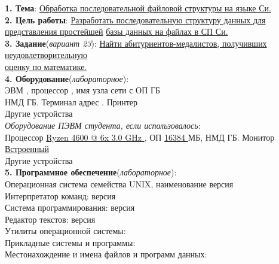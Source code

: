\documentclass[10pt]{report}
\begin{document}
    \begin{spacing}{1}
        \indent \textbf{1. Тема}: \underline{Обработка последовательной файловой структуры на языке Си.}\\               %
        \indent \textbf{2. Цель работы}: \underline{Разработать последовательную структуру данных для представления простейшей} 
        \indent \underline{базы данных на файлах в СП Си.} \\       %
        \indent \textbf{3. Задание}(\textit{вариант 23}): \underline{Найти абитуриентов-медалистов, получивших неудовлетворительную}\\
        \indent \underline{оценку по математике.}  \\           %
        \indent \textbf{4. Оборудование}(\textit{лабораторное}):  \\ 
        \indent ЭВМ \tlinee{0.5in}, процессор \tlinee{0.7in}, имя узла сети \tlinee{0.3in} с ОП \tlinee{0.2in} ГБ\\
        \indent НМД \tlinee{0.5in} ГБ. Терминал \tlinee{0.7in} адрес \tlinee{0.7in}. Принтер \tlinee{0.7in}\\
        \indent Другие устройства \tlinee{2.5in} \\
        \indent \textit{Оборудование ПЭВМ студента, если использовалось}:  \\ 
        \indent Процессор \underline{ Ryzen 4600 @ 6x 3.0 GHz }, ОП \underline{ 16384 } МБ, НМД \tlinee{0.5in}ГБ. Монитор \underline{ Встроенный }\\
        \indent Другие устройства \tlinee{2.5in} \\

        \indent \textbf{5. Программное обеспечение}(\textit{лабораторное}):  \\ 
        \indent Операционная система семейства UNIX, наименование \underline{\hspace{0.5in}} версия \underline{\hspace{0.5in}}\\
        \indent Интерпретатор  команд: \underline{\hspace{2in}} версия \tlinee{0.5in}\\
        \indent Система программирования: \tlinee{2in} версия \tlinee{0.5in}\\
        \indent Редактор текстов: \tlinee{2in} версия \tlinee{0.5in}\\
        \indent Утилиты операционной системы: \tlinee{4in}\\
        \indent Прикладные системы и программы: \tlinee{3.7in}\\
        \indent Местонахождение и имена файлов и программ данных: \tlinee{2.2in}\\


\end{spacing}
\end{document}
